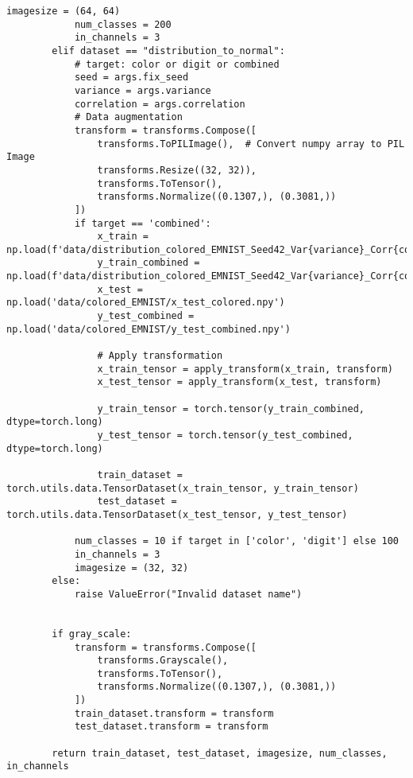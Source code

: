\begin{lstlisting}[style=pythonstyle, caption={Program Example}]
            imagesize = (64, 64)
            num_classes = 200
            in_channels = 3
        elif dataset == "distribution_to_normal":
            # target: color or digit or combined
            seed = args.fix_seed
            variance = args.variance
            correlation = args.correlation
            # Data augmentation
            transform = transforms.Compose([
                transforms.ToPILImage(),  # Convert numpy array to PIL Image
                transforms.Resize((32, 32)),
                transforms.ToTensor(),
                transforms.Normalize((0.1307,), (0.3081,))
            ])
            if target == 'combined':
                x_train = np.load(f'data/distribution_colored_EMNIST_Seed42_Var{variance}_Corr{correlation}/x_train_colored.npy')
                y_train_combined = np.load(f'data/distribution_colored_EMNIST_Seed42_Var{variance}_Corr{correlation}/y_train_combined.npy')
                x_test = np.load('data/colored_EMNIST/x_test_colored.npy')
                y_test_combined = np.load('data/colored_EMNIST/y_test_combined.npy')
                
                # Apply transformation
                x_train_tensor = apply_transform(x_train, transform)
                x_test_tensor = apply_transform(x_test, transform)
                
                y_train_tensor = torch.tensor(y_train_combined, dtype=torch.long)
                y_test_tensor = torch.tensor(y_test_combined, dtype=torch.long)
                
                train_dataset = torch.utils.data.TensorDataset(x_train_tensor, y_train_tensor)
                test_dataset = torch.utils.data.TensorDataset(x_test_tensor, y_test_tensor)
        
            num_classes = 10 if target in ['color', 'digit'] else 100
            in_channels = 3
            imagesize = (32, 32)
        else:
            raise ValueError("Invalid dataset name")
            
    
        if gray_scale:
            transform = transforms.Compose([
                transforms.Grayscale(),
                transforms.ToTensor(),
                transforms.Normalize((0.1307,), (0.3081,))
            ])
            train_dataset.transform = transform
            test_dataset.transform = transform  
    
        return train_dataset, test_dataset, imagesize, num_classes, in_channels
    

\end{lstlisting}
